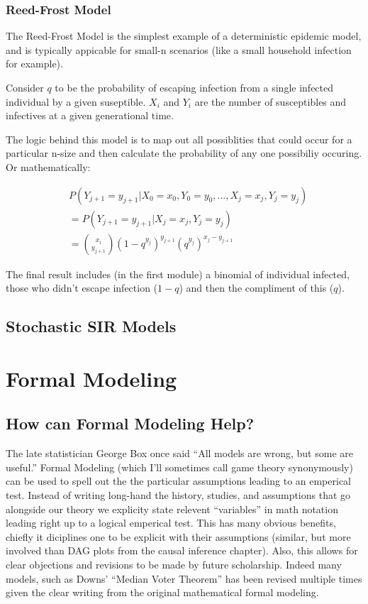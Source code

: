 \documentclass[12pt]{article}\usepackage[]{graphicx}\usepackage[]{color}
\begin{document}
\begin{flushleft}
\subsubsection{Reed-Frost Model}

The Reed-Frost Model is the simplest example of a deterministic epidemic model, and is typically appicable for small-n scenarios (like a small household infection for example).

Consider $q$ to be the probability of escaping infection from a single infected individual by a given suseptible. $X_i$ and $Y_i$ are the number of susceptibles and infectives at a given generational time.

The logic behind this model is to map out all possiblities that could occur for a particular n-size and then calculate the probability of any one possibiliy occuring. Or mathematically:

\begin{align*}
& P(Y_{j+1} = y_{j+1} | X_0 = x_0, Y_0 = y_0 , ... , X_j = x_j, Y_j =y_j) \\
&= P(Y_{j+1} = y_{j+1} | X_j = x_j, Y_j = y_j)\\
&= \binom{x_i}{y_{j+1}} (1-q^{y_j})^{y_{j+1}} (q^{y_j})^{x_j - y_{j+1}}
\end{align*}

The final result includes (in the first module) a binomial of individual infected, those who didn't escape infection ($1-q$) and then the compliment of this ($q$).


\subsection{Stochastic SIR Models}





\clearpage
\section{Formal Modeling}

\subsection{How can Formal Modeling Help?} 

The late statistician George Box once said ``All models are wrong, but some are useful.'' Formal Modeling (which I'll sometimes call game theory synonymously) can be used to spell out the the particular assumptions leading to an emperical test. Instead of writing long-hand the history, studies, and assumptions that go alongside our theory we explicity state relevent ``variables'' in math notation leading right up to a logical emperical test. This has many obvious benefits, chiefly it diciplines one to be explicit with their assumptions (similar, but more involved than DAG plots from the causal inference chapter). Also, this allows for clear objections and revisions to be made by future scholarship. Indeed many models, such as Downs' ``Median Voter Theorem'' has been revised multiple times given the clear writing from the original mathematical formal modeling.


\end{flushleft}
\end{document}
